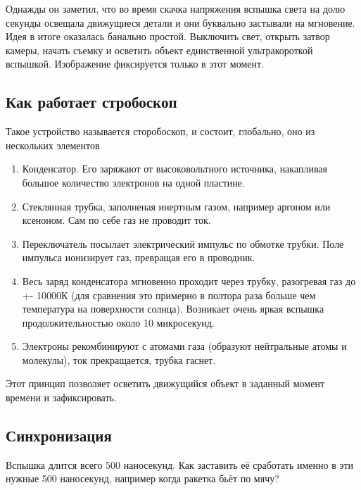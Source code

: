 \documentclass[a4paper, 11pt]{extarticle}
\begin{document}
Однажды он заметил, что во время скачка напряжения вспышка света на долю секунды освещала движущиеся детали и они буквально застывали на мгновение. Идея в итоге оказалась банально простой. Выключить свет, открыть затвор камеры, начать съемку и осветить объект единственной ультракороткой вспышкой. Изображение фиксируется только в этот момент.

\subsection{Как работает стробоскоп}

Такое устройство называется сторобоскоп, и состоит, глобально, оно из нескольких элементов

\begin{enumerate}
    \item Конденсатор. Его заряжают от высоковольтного источника, накапливая большое количество электронов на одной пластине.
    \item Стеклянная трубка, заполненая инертным газом, например аргоном или ксеноном. Сам по себе газ не проводит ток.
    \item Переключатель посылает электрический импульс по обмотке трубки. Поле импульса ионизирует газ, превращая его в проводник.
    \item Весь заряд конденсатора мгновенно проходит через трубку, разогревая газ до +- 10000К (для сравнения это примерно в полтора раза больше чем температура на поверхности солнца). Возникает очень яркая вспышка продолжительностью около 10 микросекунд.
    \item Электроны рекомбинируют с атомами газа (образуют нейтральные атомы и молекулы), ток прекращается, трубка гаснет.
\end{enumerate}

Этот принцип позволяет осветить движущийся объект в заданный момент времени и зафиксировать.

\subsection{Синхронизация}

Вспышка длится всего 500 наносекунд. Как заставить её сработать именно в эти нужные 500 наносекунд, например когда ракетка бьёт по мячу?
\end{document}
